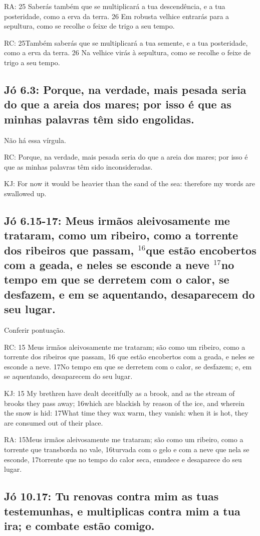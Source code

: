 RA: 25 Saberás também que se multiplicará a tua descendência, e a tua posteridade, como a erva da terra. 26 Em robusta velhice entrarás para a sepultura, como se recolhe o feixe de trigo a seu tempo.

RC: 25Também saberás que se multiplicará a tua semente, e a tua posteridade, como a erva da terra. 26 Na velhice virás à sepultura, como se recolhe o feixe de trigo a seu tempo.

\subsection{Jó 6.3: Porque, na verdade, mais pesada seria\uwave{,} do que a areia dos mares; por isso é que as minhas palavras têm sido engolidas.}
Não há essa vírgula.

RC: Porque, na verdade, mais pesada seria do que a areia dos mares; por isso é que as minhas palavras têm sido inconsideradas.

KJ: For now it would be heavier than the sand of the sea: therefore my words are swallowed up.

\subsection{Jó 6.15-17: Meus irmãos aleivosamente me trataram, como um ribeiro, como a torrente dos ribeiros que passam, $^{\mathrm{16}}$que estão encobertos com a geada, e neles se esconde a neve\uwave{,} $^{\mathrm{17}}$no tempo em que se derretem com o calor, se desfazem, e em se aquentando, desaparecem do seu lugar.}
Conferir pontuação.

RC: 15 Meus irmãos aleivosamente me trataram; são como um ribeiro, como a torrente dos ribeiros que passam, 16 que estão encobertos com a geada, e neles se esconde a neve. 17No tempo em que se derretem com o calor, se desfazem; e, em se aquentando, desaparecem do seu lugar.

KJ: 15 My brethren have dealt deceitfully as a brook, and as the stream of brooks they pass away; 16which are blackish by reason of the ice, and wherein the snow is hid: 17What time they wax warm, they vanish: when it is hot, they are consumed out of their place.

RA: 15Meus irmãos aleivosamente me trataram; são como um ribeiro, como a torrente que transborda no vale, 16turvada com o gelo e com a neve que nela se esconde, 17torrente que no tempo do calor seca, emudece e desaparece do seu lugar.

\subsection{Jó 10.17: Tu renovas contra mim as tuas testemunhas, e multiplicas contra mim a tua ira;  e combate estão comigo.}

